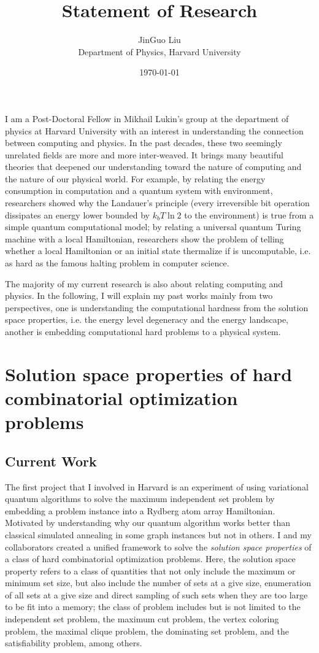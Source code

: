 \documentclass[a4paper]{article}
\title{Statement of Research}
\author{JinGuo Liu\\ Department of Physics, Harvard University}
\date{\today}
\newcommand{\<}{\langle}
\renewcommand{\>}{\rangle}
\begin{document}
\fontsize{10}{13}
\selectfont
\maketitle

I am a Post-Doctoral Fellow in Mikhail Lukin's group at the department of physics at Harvard University with an interest in understanding the connection between computing and physics.
In the past decades, these two seemingly unrelated fields are more and more inter-weaved.
It brings many beautiful theories that deepened our understanding toward the nature of computing and the nature of our physical world.
For example, 
by relating the energy consumption in computation and a quantum system with environment, researchers showed why the Landauer's principle (every irreversible bit operation dissipates an energy lower bounded by $k_bT\ln 2$ to the environment) is true from a simple quantum computational model;
by relating a universal quantum Turing machine with a local Hamiltonian, researchers show the problem of telling whether a local Hamiltonian or an initial state thermalize if is uncomputable, i.e. as hard as the famous halting problem in computer science.

The majority of my current research is also about relating computing and physics.
In the following, I will explain my past works mainly from two perspectives, one is understanding the computational hardness from the solution space properties, i.e. the energy level degeneracy and the energy landscape, another is embedding computational hard problems to a physical system.

\section{Solution space properties of hard combinatorial optimization problems}
\subsection{Current Work}
The first project that I involved in Harvard is an experiment of using variational quantum algorithms to solve the maximum independent set problem by embedding a problem instance into a Rydberg atom array Hamiltonian.
Motivated by understanding why our quantum algorithm works better than classical simulated annealing in some graph instances but not in others.
I and my collaborators created a unified framework to solve the \textit{solution space properties} of a class of hard combinatorial optimization problems. Here, the solution space property refers to a class of quantities that not only include the maximum or minimum set size, but also include the number of sets at a give size, enumeration of all sets at a give size and direct sampling of such sets when they are too large to be fit into a memory; the class of problem includes but is not limited to the independent set problem, the maximum cut problem, the vertex coloring problem, the maximal clique problem, the dominating set problem, and the satisfiability problem, among others.
\end{document}
